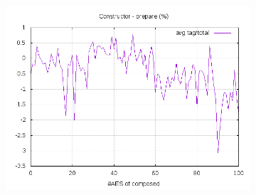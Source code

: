 \documentclass[10pt,a4paper]{article}
\begin{document}
\begin{figure}[h]
\begin{subfigure}[t]{0.3\textwidth}
        \includegraphics[width=\textwidth]{const_prepare_frac}
        \caption{}
        \label{data const prepare frac}
    \end{subfigure}


\end{figure}
\end{document}
